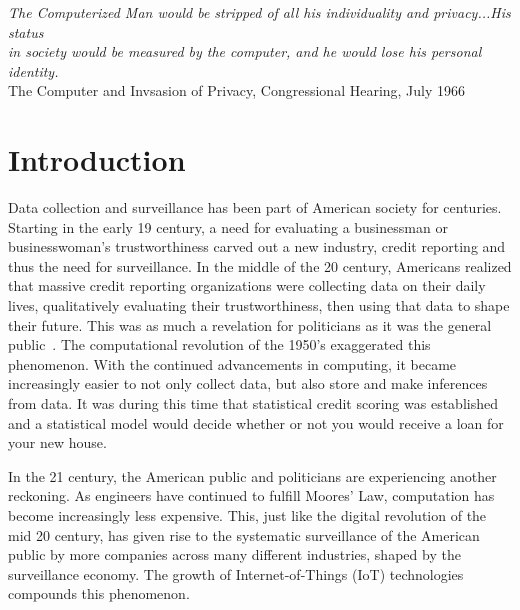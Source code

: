 \begin{center}
\textit{
The Computerized Man would be stripped of all his individuality and privacy...His status\\
in society would be measured by the computer, and he would lose his personal identity.} \\
The Computer and Invsasion of Privacy, Congressional Hearing, July 1966
\end{center}

\section{Introduction}

Data collection and surveillance has been part of American society for
centuries. Starting in the early 19 century, a need for evaluating a
businessman or businesswoman's trustworthiness carved out a new industry,
credit reporting and thus the need for surveillance. In the middle of the 20 century, Americans realized
that massive credit reporting organizations were collecting data on their
daily lives, qualitatively evaluating their trustworthiness, then using that
data to shape their future. This was as much a revelation for politicians as it
was the general public~\cite{lauer2017creditworthy}. The computational revolution of the 1950's exaggerated
this phenomenon. With the continued advancements in computing, it became
increasingly easier to not only collect data, but also store and make
inferences from data. It was during this time that statistical credit scoring
was established and a statistical model would decide whether or not you would
receive a loan for your new house.

In the 21 century, the American public and politicians are experiencing
another reckoning. As engineers have continued to fulfill Moores' Law,
computation has become increasingly less expensive. This, just like the digital
revolution of the mid 20 century, has given rise to the systematic
surveillance of the American public by more companies across many different
industries, shaped by the surveillance economy. The growth of Internet-of-Things
(IoT) technologies compounds this phenomenon.

